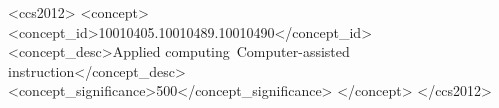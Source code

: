 \documentclass[acmsmall]{acmart}
\begin{document}
\renewcommand{\shortauthors}{Weiyuan Zhou et al.}


\begin{CCSXML}
<ccs2012>
   <concept>
       <concept_id>10010405.10010489.10010490</concept_id>
       <concept_desc>Applied computing~Computer-assisted instruction</concept_desc>
       <concept_significance>500</concept_significance>
       </concept>
 </ccs2012>
\end{CCSXML}




\maketitle
































\appendix
% 
\end{document}
